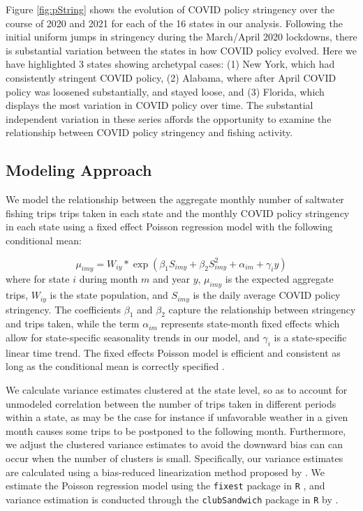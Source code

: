 \documentclass[12pt]{article}
\begin{document}
Figure \ref{fig:pString} shows the evolution of COVID policy stringency
over the course of 2020 and 2021 for each of the 16 states in our
analysis. Following the initial uniform jumps in stringency during the
March/April 2020 lockdowns, there is substantial variation between the
states in how COVID policy evolved. Here we have highlighted 3 states
showing archetypal cases: (1) New York, which had consistently stringent
COVID policy, (2) Alabama, where after April COVID policy was loosened
substantially, and stayed loose, and (3) Florida, which displays the
most variation in COVID policy over time. The substantial independent
variation in these series affords the opportunity to examine the
relationship between COVID policy stringency and fishing activity.

\subsection{Modeling Approach}

We model the relationship between the aggregate monthly number of
saltwater fishing trips trips taken in each state and the monthly COVID
policy stringency in each state using a fixed effect Poisson regression model with the
following conditional mean:

\[\mu_{imy} = W_{iy}*\exp(\beta_1 S_{imy} + \beta_2 S_{imy}^2 + \alpha_{im} + \gamma_i y)\]
where for state \(i\) during month \(m\) and year \(y\), \(\mu_{imy}\)
is the expected aggregate trips, \(W_{iy}\) is the state population, and
\(S_{imy}\) is the daily average COVID policy stringency. The
coefficients \(\beta_1\) and \(\beta_2\) capture the 
relationship between stringency and trips taken, while the term
\(\alpha_{im}\) represents state-month fixed effects which allow for
state-specific seasonality trends in our model, and \(\gamma_i\) is a
state-specific linear time trend. The fixed effects Poisson model is efficient and consistent as long as the conditional mean is correctly specified \citet{wooldridge2010econometric}.

We calculate variance estimates clustered at the state level, so as to
account for unmodeled correlation between the number of trips taken in
different periods within a state, as may be the case for instance if
unfavorable weather in a given month causes some trips to be postponed
to the following month. Furthermore, we adjust the clustered variance estimates
to avoid the downward bias can can occur when the number of clusters is small. Specifically, our variance estimates are calculated
using a bias-reduced linearization method proposed by \citet{bell2002bias}. We estimate the Poisson regression model using the
\texttt{fixest} package in \texttt{R} \citep{berge2018Efficient}, and variance
estimation is conducted through the \texttt{clubSandwich} package in
\texttt{R} by \citet{pustejovsky2016Small}.
\end{document}
